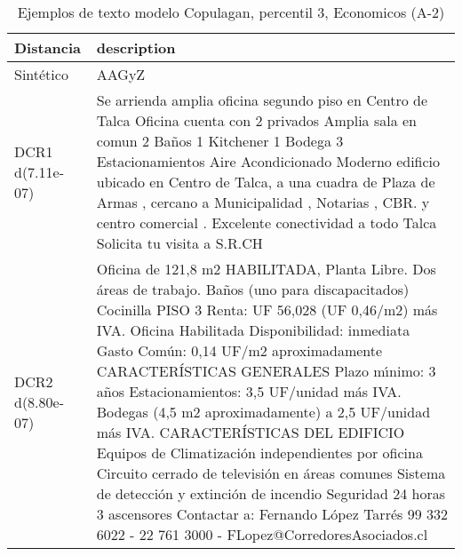 \begin{table}[H]
\centering
\fontsize{10}{14}\selectfont
\caption{Ejemplos de texto modelo Copulagan, percentil 3, Economicos (A-2)}
\label{table-example-economicos-a-2-copulagan-3p-text}
\begin{tabular}{|l|m{35em}|}
\hline
\rowcolor[gray]{0.8}
Distancia & description \\
\hline Sintético & AAGyZ \\
\hline DCR1 d(7.11e-07) & Se arrienda amplia oficina segundo piso en Centro de Talca  Oficina cuenta con 2 privados  Amplia sala en comun 2 Ba\~nos  1 Kitchener 1 Bodega  3 Estacionamientos  Aire Acondicionado Moderno edificio ubicado en Centro de Talca, a una cuadra de Plaza de Armas , cercano a Municipalidad , Notarias , CBR. y centro comercial . Excelente conectividad a todo Talca  Solicita tu visita a S.R.CH \\
\hline DCR2 d(8.80e-07) & Oficina de 121,8 m2 HABILITADA, Planta Libre.  Dos \'areas de trabajo. Ba\~nos (uno para discapacitados) Cocinilla  PISO 3   Renta: UF 56,028 (UF 0,46/m2) m\'as IVA.   Oficina Habilitada   Disponibilidad: inmediata   Gasto Com\'un: 0,14 UF/m2 aproximadamente  CARACTER\'ISTICAS GENERALES   Plazo m{\'\i}nimo: 3 a\~nos   Estacionamientos: 3,5 UF/unidad m\'as IVA.   Bodegas (4,5 m2 aproximadamente) a 2,5 UF/unidad m\'as IVA.  CARACTER\'ISTICAS DEL EDIFICIO   Equipos de Climatizaci\'on independientes por oficina   Circuito cerrado de televisi\'on en \'areas comunes   Sistema de detecci\'on y extinci\'on de incendio   Seguridad 24 horas   3 ascensores  Contactar a: Fernando L\'opez Tarr\'es 99 332 6022 - 22 761 3000 - FLopez@CorredoresAsociados.cl \\
\hline
\end{tabular}
\end{table}
